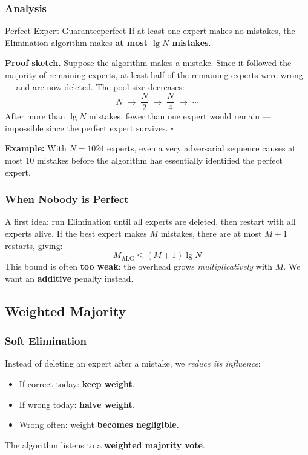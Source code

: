 \subsubsection{Analysis}

\begin{theorem}{Perfect Expert Guarantee}{perfect}
If at least one expert makes no mistakes, the Elimination algorithm makes \textbf{at most $\lg N$ mistakes}.
\end{theorem}

\textbf{Proof sketch.} Suppose the algorithm makes a mistake. Since it followed the majority of remaining experts, at least half of the remaining experts were wrong — and are now deleted. The pool size decreases:
\[
N \;\to\; \frac{N}{2} \;\to\; \frac{N}{4} \;\to\; \cdots
\]
After more than $\lg N$ mistakes, fewer than one expert would remain — impossible since the perfect expert survives. \hfill$\square$

\textbf{Example:} With $N = 1024$ experts, even a very adversarial sequence causes at most 10 mistakes before the algorithm has essentially identified the perfect expert.

\subsubsection{When Nobody is Perfect}

A first idea: run Elimination until all experts are deleted, then restart with all experts alive. If the best expert makes $M$ mistakes, there are at most $M+1$ restarts, giving:
\[
M_{\mathrm{ALG}} \leq (M+1) \lg N
\]
This bound is often \textbf{too weak}: the overhead grows \emph{multiplicatively} with $M$. We want an \textbf{additive} penalty instead.

\subsection{Weighted Majority}

\subsubsection{Soft Elimination}

Instead of deleting an expert after a mistake, we \emph{reduce its influence}:
\begin{itemize}
  \item If correct today: \textbf{keep weight}.
  \item If wrong today: \textbf{halve weight}.
  \item Wrong often: weight \textbf{becomes negligible}.
\end{itemize}
The algorithm listens to a \textbf{weighted majority vote}.

